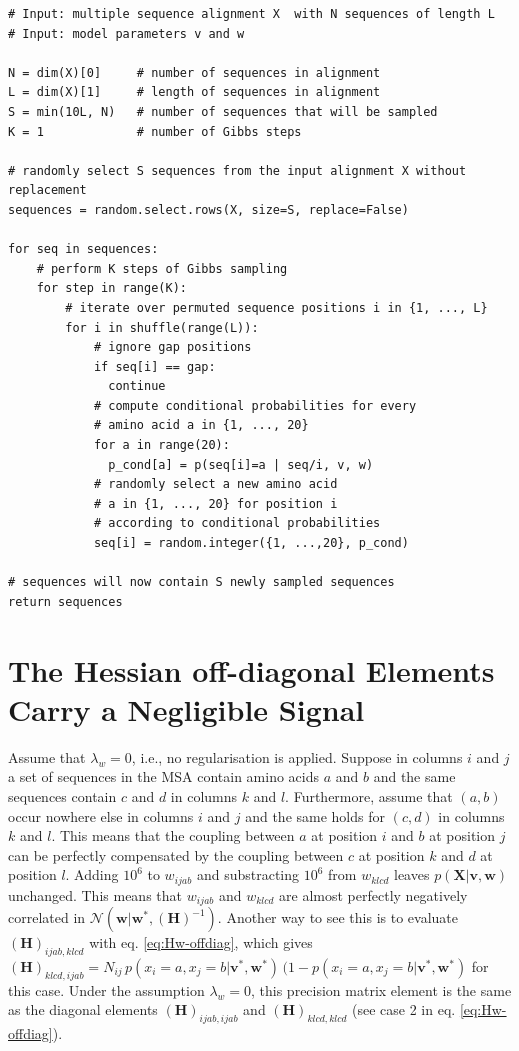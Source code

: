 \documentclass[11pt,a4paper,twoside]{book}
\newcommand{\eq}{\!=\!}
\newcommand{\Gauss}{\mathcal{N}}
\renewcommand{\H}{\mathbf{H}}
\renewcommand{\v}{\mathbf{v}}
\newcommand{\w}{\mathbf{w}}
\newcommand{\X}{\mathbf{X}}
\theoremstyle{definition}
\theoremstyle{definition}
\theoremstyle{remark}
\begin{document}
\begin{verbatim}
# Input: multiple sequence alignment X  with N sequences of length L
# Input: model parameters v and w

N = dim(X)[0]     # number of sequences in alignment
L = dim(X)[1]     # length of sequences in alignment
S = min(10L, N)   # number of sequences that will be sampled
K = 1             # number of Gibbs steps

# randomly select S sequences from the input alignment X without replacement
sequences = random.select.rows(X, size=S, replace=False)

for seq in sequences:
    # perform K steps of Gibbs sampling
    for step in range(K):
        # iterate over permuted sequence positions i in {1, ..., L}
        for i in shuffle(range(L)):
            # ignore gap positions
            if seq[i] == gap:
              continue
            # compute conditional probabilities for every 
            # amino acid a in {1, ..., 20}
            for a in range(20):
              p_cond[a] = p(seq[i]=a | seq/i, v, w)
            # randomly select a new amino acid 
            # a in {1, ..., 20} for position i 
            # according to conditional probabilities
            seq[i] = random.integer({1, ...,20}, p_cond)

# sequences will now contain S newly sampled sequences
return sequences
\end{verbatim}

\section{The Hessian off-diagonal Elements Carry a Negligible
Signal}\label{Hessian-offdiagonal}

Assume that \(\lambda_w=0\), i.e., no regularisation is applied. Suppose
in columns \(i\) and \(j\) a set of sequences in the MSA contain amino
acids \(a\) and \(b\) and the same sequences contain \(c\) and \(d\) in
columns \(k\) and \(l\). Furthermore, assume that \((a,b)\) occur
nowhere else in columns \(i\) and \(j\) and the same holds for \((c,d)\)
in columns \(k\) and \(l\). This means that the coupling between \(a\)
at position \(i\) and \(b\) at position \(j\) can be perfectly
compensated by the coupling between \(c\) at position \(k\) and \(d\) at
position \(l\). Adding \(10^6\) to \(w_{ijab}\) and substracting
\(10^6\) from \(w_{klcd}\) leaves \(p(\X|\v,\w)\) unchanged. This means
that \(w_{ijab}\) and \(w_{klcd}\) are almost perfectly negatively
correlated in \(\Gauss(\w|\w^*,(\H)^{-1})\). Another way to see this is
to evaluate \((\H)_{ijab,klcd}\) with eq. \eqref{eq:Hw-offdiag}, which
gives
\((\H)_{klcd, ijab}=N_{ij}\,p(x_i \eq a, x_j \eq b| \v^*,\w^*) \, ( 1 - p(x_i \eq a, x_j \eq b| \v^*,\w^*)\)
for this case. Under the assumption \(\lambda_w=0\), this precision
matrix element is the same as the diagonal elements
\((\H)_{ijab, ijab}\) and \((\H)_{klcd, klcd}\) (see case 2 in eq.
\eqref{eq:Hw-offdiag}).
\end{document}
